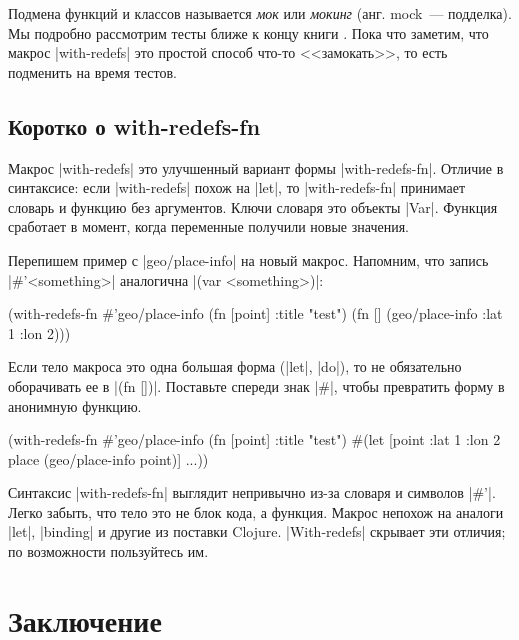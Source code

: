 Подмена функций и классов называется \emph{мок} или \emph{мокинг} (анг. mock~---
подделка). Мы подробно рассмотрим тесты ближе к концу
книги . Пока что заметим, что макрос \spverb|with-redefs|
это простой способ что-то <<замокать>>, то есть подменить на время тестов.

\subsection{Коротко о with-redefs-fn}

Макрос \spverb|with-redefs| это улучшенный вариант формы
\spverb|with-redefs-fn|. Отличие в синтаксисе: если \spverb|with-redefs| похож
на \spverb|let|, то \spverb|with-redefs-fn| принимает словарь и функцию без
аргументов. Ключи словаря это объекты \spverb|Var|. Функция сработает в момент,
когда переменные получили новые значения.

Перепишем пример с \spverb|geo/place-info| на новый макрос. Напомним, что запись
\spverb|#'<something>| аналогична \spverb|(var <something>)|:

\begin{english}
  \begin{clojure}
(with-redefs-fn
  {#'geo/place-info (fn [point] {:title "test"})}
  (fn []
    (geo/place-info {:lat 1 :lon 2})))
  \end{clojure}
\end{english}

Если тело макроса это одна большая форма (\spverb|let|, \spverb|do|), то не
обязательно оборачивать ее в \spverb|(fn [])|. Поставьте спереди знак
\spverb|#|, чтобы превратить форму в анонимную функцию.

\begin{english}
  \begin{clojure}
(with-redefs-fn
  {#'geo/place-info (fn [point] {:title "test"})}
  #(let [point {:lat 1 :lon 2}
         place (geo/place-info point)]
     ...))
  \end{clojure}
\end{english}

Синтаксис \spverb|with-redefs-fn| выглядит непривычно из-за словаря и символов
\spverb|#'|. Легко забыть, что тело это не блок кода, а функция. Макрос непохож
на аналоги \spverb|let|, \spverb|binding| и другие из поставки Clojure.
\spverb|With-redefs| скрывает эти отличия; по возможности пользуйтесь им.

\section{Заключение}

